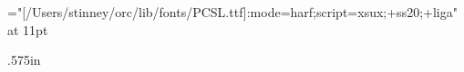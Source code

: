 \font\pczatu="[/Users/stinney/orc/lib/fonts/PCSL.ttf]:mode=harf;script=xsux;+ss20;+liga" at 11pt

\def\beginzatupcsl{\begin{multicols}{3}%
    \columnseprule.4pt
    \parindent0pt\relax
    \rightskip0pt plus1fil\relax
    \parskip2pt plus1fil minus2pt\relax
}
\def\endzatupcsl{\end{multicols}\vfil\supereject}

\def\zcczatufont{\sansc}
\def\zccsnamefont{\sansc}

\newdimen\zheadwd \zheadwd.575in
\newdimen\zchrht  {}
\def\zentry{\leavevmode\hangindent\zheadwd}
\def\zhead#1{\hboxtomin{\zheadwd}{\zcczatufont#1}}
\def\zpcsl#1{#1\endgraf\goodbreak}
\def\zchrnam#1#2{\hbox{\hbox{\pczatu#1}\kern3pt\hbox{\zccsnamefont#2\hfil}}}
\def\zref#1{{\baselineskip9pt\relax\sansc#1\endgraf}}
\def\zsee#1{\sansc#1\hss}
\def\zcomma{, }
\def\zspace{; }
